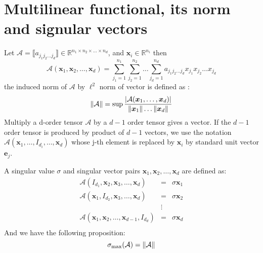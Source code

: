 \documentclass{article}
\def\R{\mathbb{R}}
\DeclarePairedDelimiter\abs{\lvert}{\rvert}
\DeclarePairedDelimiter\norm{\lVert}{\rVert}
\begin{document}
\section{Multilinear functional, its norm and signular vectors}
Let $\mathcal{A} = \llbracket a_{j_1j_2\dots j_d} \rrbracket \in \R^{n_1 \times n_2 \times \dots \times n_d}$, and $\bm{x}_i \in \R^{n_i}$
then 
\begin{equation}
\mathcal{A}(\bm{x}_1, \bm{x}_2, \dots, \bm{x}_d) = \sum_{j_1 = 1}^{n_1}\sum_{j_2 = 1}^{n_2} \dots
\sum_{j_d = 1}^{n_d} a_{j_1 j_2 \dots j_d} x_{j_1} x_{j_2} \dots x_{j_d}
\end{equation}
the induced norm of $\mathcal{A}$ by $\ell^2$ norm of vector is defined as :
\begin{equation}
\norm{\mathcal{A}} = \sup \frac{\abs{\mathcal{A}(\bm{x}_1, \dots, \bm{x}_d)}}{\norm{\bm{x}_1} \dots \norm{\bm{x}_d}}
\end{equation} 
Multiply a d-order tensor $\mathcal{A}$ by a $d-1$ order tensor gives a vector. If the $d-1$ order tensor is produced by product of $d-1$ vectors, we use the notation $\mathcal{A}(\bm{x}_1, \dots, I_{d_i}, \dots, \bm{x}_d)$ whose j-th element is
replaced by $\bm{x}_i$ by standard unit vector $\bm{e}_j$.

A singular value $\sigma$ and singular vector pairs $\bm{x}_1, \bm{x}_2, \dots, \bm{x}_d$ are defined as:
\begin{equation}
\begin{array}{ccc}
\mathcal{A}(I_{d_1}, \bm{x}_2, \bm{x}_3, \dots, \bm{x}_d) & = & \sigma \bm{x}_1 \\
\mathcal{A}(\bm{x}_1,  I_{d_2}, \bm{x}_3,\dots, \bm{x}_d)  & = & \sigma \bm{x}_2 \\
& \vdots & \\
\mathcal{A}(\bm{x}_1, \bm{x}_2, \dots, \bm{x}_{d-1}, I_{d_d})  & = & \sigma \bm{x}_d \\
\end{array}
\end{equation}
And we have the following proposition:
\begin{equation}
\sigma_{\max}(\mathcal{A}) = \norm{\mathcal{A}}
\end{equation}
\end{document}
